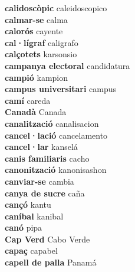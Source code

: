 \textbf{ calidoscòpic  } caleidoscopico \\
\textbf{ calmar-se  } calma \\
\textbf{ calorós  } cayente \\
\textbf{ cal·lígraf  } caligrafo \\
\textbf{ calçotets  } karsonsio \\
\textbf{ campanya electoral  } candidatura \\
\textbf{ campió  } kampion \\
\textbf{ campus universitari  } campus \\
\textbf{ camí  } careda \\
\textbf{ Canadà  } Canada \\
\textbf{ canalització  } canalisacion \\
\textbf{ cancel·lació  } cancelamento \\
\textbf{ cancel·lar  } kanselá \\
\textbf{ canis familiaris  } cacho \\
\textbf{ canonització  } kanonisashon \\
\textbf{ canviar-se  } cambia \\
\textbf{ canya de sucre  } caña \\
\textbf{ cançó  } kantu \\
\textbf{ caníbal  } kanibal \\
\textbf{ canó  } pipa \\
\textbf{ Cap Verd  } Cabo Verde \\
\textbf{ capaç  } capabel \\
\textbf{ capell de palla  } Panamá \\
